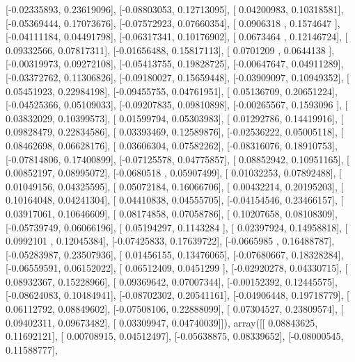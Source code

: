 \documentclass{article}
\begin{document}
       [-0.02335893,  0.23619096],
       [-0.08803053,  0.12713095],
       [ 0.04200983,  0.10318581],
       [-0.05369444,  0.17073676],
       [-0.07572923,  0.07660354],
       [ 0.0906318 ,  0.1574647 ],
       [-0.04111184,  0.04491798],
       [-0.06317341,  0.10176902],
       [ 0.0673464 ,  0.12146724],
       [ 0.09332566,  0.07817311],
       [-0.01656488,  0.15817113],
       [ 0.0701209 ,  0.0644138 ],
       [-0.00319973,  0.09272108],
       [-0.05413755,  0.19828725],
       [-0.00647647,  0.04911289],
       [-0.03372762,  0.11306826],
       [-0.09180027,  0.15659448],
       [-0.03909097,  0.10949352],
       [ 0.05451923,  0.22984198],
       [-0.09455755,  0.04761951],
       [ 0.05136709,  0.20651224],
       [-0.04525366,  0.05109033],
       [-0.09207835,  0.09810898],
       [-0.00265567,  0.1593096 ],
       [ 0.03832029,  0.10399573],
       [ 0.01599794,  0.05303983],
       [ 0.01292786,  0.14419916],
       [ 0.09828479,  0.22834586],
       [ 0.03393469,  0.12589876],
       [-0.02536222,  0.05005118],
       [ 0.08462698,  0.06628176],
       [ 0.03606304,  0.07582262],
       [-0.08316076,  0.18910753],
       [-0.07814806,  0.17400899],
       [-0.07125578,  0.04775857],
       [ 0.08852942,  0.10951165],
       [ 0.00852197,  0.08995072],
       [-0.0680518 ,  0.05907499],
       [ 0.01032253,  0.07892488],
       [ 0.01049156,  0.04325595],
       [ 0.05072184,  0.16066706],
       [ 0.00432214,  0.20195203],
       [ 0.10164048,  0.04241304],
       [ 0.04410838,  0.04555705],
       [-0.04154546,  0.23466157],
       [ 0.03917061,  0.10646609],
       [ 0.08174858,  0.07058786],
       [ 0.10207658,  0.08108309],
       [-0.05739749,  0.06066196],
       [ 0.05194297,  0.1143284 ],
       [ 0.02397924,  0.14958818],
       [ 0.0992101 ,  0.12045384],
       [-0.07425833,  0.17639722],
       [-0.0665985 ,  0.16488787],
       [-0.05283987,  0.23507936],
       [ 0.01456155,  0.13476065],
       [-0.07680667,  0.18328284],
       [-0.06559591,  0.06152022],
       [ 0.06512409,  0.0451299 ],
       [-0.02920278,  0.04330715],
       [ 0.08932367,  0.15228966],
       [ 0.09369642,  0.07007344],
       [-0.00152392,  0.12445575],
       [-0.08624083,  0.10484941],
       [-0.08702302,  0.20541161],
       [-0.04906448,  0.19718779],
       [ 0.06112792,  0.08849602],
       [-0.07508106,  0.22888099],
       [ 0.07304527,  0.23809574],
       [ 0.09402311,  0.09673482],
       [ 0.03309947,  0.04740039]]), array([[ 0.08843625,  0.11692121],
       [ 0.00708915,  0.04512497],
       [-0.05638875,  0.08339652],
       [-0.08000545,  0.11588777],
\end{document}
